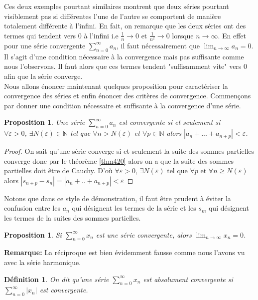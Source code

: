 \documentclass[a4paper, 12pt, french, twoside]{article}
\newtheorem{proposition}[theorem]{Proposition}
\newtheorem{defi}[theorem]{Définition}
\newcommand{\Nn}{{\mathbb{N}}}
\begin{document}
Ces deux exemples pourtant similaires montrent que deux séries pourtant visiblement pas si différentes l'une de l'autre se comportent de manière totalement différente à l'infini. En fait, on remarque que les deux séries ont des termes qui tendent vers 0 à l'infini i.e $\frac{1}{n} \rightarrow 0$ et $\frac{1}{n^2} \rightarrow 0$ lorsque $n \rightarrow \infty$. En effet pour une série convergente $\sum_{n=0}^{\infty} a_n$, il faut nécessairement que $\lim_{n\to \infty} a_n = 0$. Il s'agit d'une condition nécessaire à la convergence mais pas suffisante comme nous l'observons. Il faut alors que ces termes tendent "suffisamment vite" vers 0 afin que la série converge. 
\newline
\\Nous allons énoncer maintenant quelques proposition pour caractériser la convergence des séries et enfin énoncer des critères de convergence.
Commençons par donner une condition nécessaire et suffisante à la convergence d'une série.
\begin{proposition}
    Une série $\sum_{n = 0}^{\infty} a_n$ est convergente si et seulement si 
    \\\quad $ \forall \varepsilon > 0$, $\exists N(\varepsilon) \in \Nn $ tel que $\forall n > N(\varepsilon)$ et $\forall p \in \Nn $ alors $|a_n + ... + a_{n+p}| < \varepsilon$. 
\end{proposition}
\begin{proof}
   On sait qu'une série converge si et seulement la suite des sommes partielles converge donc par le théorème \ref{thm420} alors on a que la suite des sommes partielles doit être de Cauchy. D'où $\forall \varepsilon >0 $, $\exists N(\varepsilon)$ tel que $\forall p$ et $\forall n \ge N(\varepsilon)$ alors $|s_{n+p} - s_n| = | a_n + .. + a_{n+p}| < \varepsilon$ 
\end{proof}
Notons que dans ce style de démonstration, il faut être prudent à éviter la confusion entre les $a_n$ qui désignent les termes de la série et les $s_m$ qui désignent les termes de la suites des sommes partielles. 

\begin{proposition}
    Si $\sum_{n=0}^{\infty} x_n$ est une série convergente, alors $\lim_{n\rightarrow\infty}x_n=0$.
\end{proposition} 
\textbf{Remarque: }La réciproque est bien évidemment fausse comme nous l'avons vu avec la série harmonique. 
\begin{defi}
    On dit qu'une série $\sum_{n=0}^{\infty} x_n$ est absolument convergente si $\sum_{n=0}^{\infty} |x_n|$ est convergente.
\end{defi}
\end{document}
